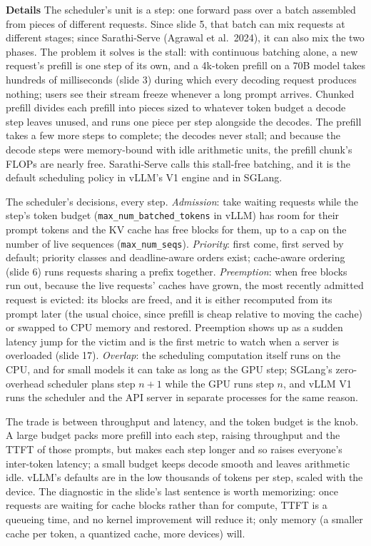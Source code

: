 \documentclass[11pt,letterpaper]{article}
\newcommand{\para}[1]{\medskip\noindent\textbf{#1}\quad}
\begin{document}
\para{Details} The scheduler's unit is a step: one forward pass over a batch assembled from pieces of different requests. Since slide 5, that batch can mix requests at different stages; since Sarathi-Serve (Agrawal et al.\ 2024), it can also mix the two phases. The problem it solves is the stall: with continuous batching alone, a new request's prefill is one step of its own, and a 4k-token prefill on a 70B model takes hundreds of milliseconds (slide 3) during which every decoding request produces nothing; users see their stream freeze whenever a long prompt arrives. Chunked prefill divides each prefill into pieces sized to whatever token budget a decode step leaves unused, and runs one piece per step alongside the decodes. The prefill takes a few more steps to complete; the decodes never stall; and because the decode steps were memory-bound with idle arithmetic units, the prefill chunk's FLOPs are nearly free. Sarathi-Serve calls this stall-free batching, and it is the default scheduling policy in vLLM's V1 engine and in SGLang.

The scheduler's decisions, every step. \emph{Admission}: take waiting requests while the step's token budget (\texttt{max\_num\_batched\_tokens} in vLLM) has room for their prompt tokens and the KV cache has free blocks for them, up to a cap on the number of live sequences (\texttt{max\_num\_seqs}). \emph{Priority}: first come, first served by default; priority classes and deadline-aware orders exist; cache-aware ordering (slide 6) runs requests sharing a prefix together. \emph{Preemption}: when free blocks run out, because the live requests' caches have grown, the most recently admitted request is evicted: its blocks are freed, and it is either recomputed from its prompt later (the usual choice, since prefill is cheap relative to moving the cache) or swapped to CPU memory and restored. Preemption shows up as a sudden latency jump for the victim and is the first metric to watch when a server is overloaded (slide 17). \emph{Overlap}: the scheduling computation itself runs on the CPU, and for small models it can take as long as the GPU step; SGLang's zero-overhead scheduler plans step $n+1$ while the GPU runs step $n$, and vLLM V1 runs the scheduler and the API server in separate processes for the same reason.

The trade is between throughput and latency, and the token budget is the knob. A large budget packs more prefill into each step, raising throughput and the TTFT of those prompts, but makes each step longer and so raises everyone's inter-token latency; a small budget keeps decode smooth and leaves arithmetic idle. vLLM's defaults are in the low thousands of tokens per step, scaled with the device. The diagnostic in the slide's last sentence is worth memorizing: once requests are waiting for cache blocks rather than for compute, TTFT is a queueing time, and no kernel improvement will reduce it; only memory (a smaller cache per token, a quantized cache, more devices) will.
\end{document}
